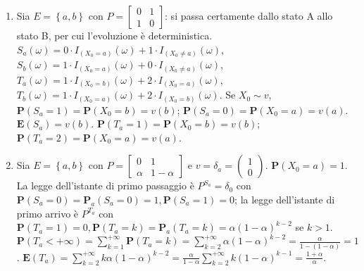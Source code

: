 \documentclass{article}
\begin{document}
\begin{enumerate}
\item Sia $E=\left\{ a,b\right\} $ con $P=\left[ 
\begin{array}{cc}
0 & 1 \\ 
1 & 0%
\end{array}%
\right] $: si passa certamente dallo stato A allo stato B, per cui
l'evoluzione \`{e} deterministica. $S_{a}\left( \omega \right) =0\cdot
I_{\left( X_{0}=a\right) }\left( \omega \right) +1\cdot I_{\left( X_{0}\neq
a\right) }\left( \omega \right) $, $S_{b}\left( \omega \right) =1\cdot
I_{\left( X_{0}=a\right) }\left( \omega \right) +0\cdot I_{\left( X_{0}\neq
a\right) }\left( \omega \right) $, $T_{a}\left( \omega \right) =1\cdot
I_{\left( X_{0}=b\right) }\left( \omega \right) +2\cdot I_{\left(
X_{0}=a\right) }\left( \omega \right) $, $T_{b}\left( \omega \right) =1\cdot
I_{\left( X_{0}=a\right) }\left( \omega \right) +2\cdot I_{\left(
X_{0}=b\right) }\left( \omega \right) $. Se $X_{0}\sim v$, $\mathbf{P}\left(
S_{a}=1\right) =\mathbf{P}\left( X_{0}=b\right) =v\left( b\right) $; $%
\mathbf{P}\left( S_{a}=0\right) =\mathbf{P}\left( X_{0}=a\right) =v\left(
a\right) $. $\mathbf{E}\left( S_{a}\right) =v\left( b\right) $. $\mathbf{P}%
\left( T_{a}=1\right) =\mathbf{P}\left( X_{0}=b\right) =v\left( b\right) $; $%
\mathbf{P}\left( T_{a}=2\right) =\mathbf{P}\left( X_{0}=a\right) =v\left(
a\right) $.

\item Sia $E=\left\{ a,b\right\} $ con $P=\left[ 
\begin{array}{cc}
0 & 1 \\ 
\alpha & 1-\alpha%
\end{array}%
\right] $ e $v=\delta _{a}=\left( 
\begin{array}{c}
1 \\ 
0%
\end{array}%
\right) $. $\mathbf{P}\left( X_{0}=a\right) =1$. La legge dell'istante di
primo passaggio \`{e} $P^{S_{a}}=\delta _{0}$ con $\mathbf{P}\left(
S_{a}=0\right) =\mathbf{P}_{a}\left( S_{a}=0\right) =1,\mathbf{P}\left(
S_{a}=1\right) =0$; la legge dell'istante di primo arrivo \`{e} $P^{T_{a}}$
con $\mathbf{P}\left( T_{a}=1\right) =0,\mathbf{P}\left( T_{a}=k\right) =%
\mathbf{P}_{a}\left( T_{a}=k\right) =\alpha \left( 1-\alpha \right) ^{k-2}$
se $k>1$. $\mathbf{P}\left( T_{a}<+\infty \right) =\sum_{k=1}^{+\infty }%
\mathbf{P}\left( T_{a}=k\right) =\sum_{k=2}^{+\infty }\alpha \left( 1-\alpha
\right) ^{k-2}=\frac{\alpha }{1-\left( 1-\alpha \right) }=1$. $\mathbf{E}%
\left( T_{a}\right) =\sum_{k=2}^{+\infty }k\alpha \left( 1-\alpha \right)
^{k-2}=\frac{\alpha }{1-\alpha }\sum_{k=2}^{+\infty }k\left( 1-\alpha
\right) ^{k-1}=\frac{1+\alpha }{\alpha }$.
\end{enumerate}
\end{document}
